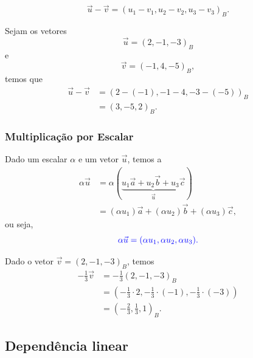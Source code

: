 \begin{equation}
  \vec{u}-\vec{v} = (u_1-v_1, u_2-v_2, u_3-v_3)_B.
\end{equation}

\begin{ex}
  Sejam os vetores 
  \begin{equation}
    \vec{u} = (2, -1, -3)_B
  \end{equation}
  e 
  \begin{equation}
    \vec{v} = (-1, 4, -5)_B,
  \end{equation}
  temos que
  \begin{align}
    \vec{u}-\vec{v} &= \left(2-(-1), -1-4, -3-(-5)\right)_B\\
                    &= (3,-5,2)_B.
  \end{align}
\end{ex}

\subsubsection{Multiplicação por Escalar}

Dado um escalar $\alpha$ e um vetor $\vec{u}$, temos a 
\begin{align}
  \alpha\vec{u} &= \alpha(\underbrace{u_1\vec{a} + u_2\vec{b} + u_3\vec{c}}_{\vec{u}})\\
                &= (\alpha u_1)\vec{a} + (\alpha u_2)\vec{b} + (\alpha u_3)\vec{c},
\end{align}
ou seja,
\begin{equation}\color{blue}\alpha\vec{u} = (\alpha u_1,\alpha u_2, \alpha u_3).
\end{equation}

\begin{ex}
  Dado o vetor $\vec{v} = (2, -1, -3)_B$, temos
  \begin{align}
    -\frac{1}{3}\vec{v} &= -\frac{1}{3}(2, -1, -3)_B\\
                        &= \left(-\frac{1}{3}\cdot 2, -\frac{1}{3}\cdot(-1), -\frac{1}{3}\cdot(-3)\right)\\
                        &= \left(-\frac{2}{3}, \frac{1}{3}, 1\right)_B.
  \end{align}
\end{ex}

\subsection{Dependência linear}\label{cap_base_sec_base_subsec_dl}

